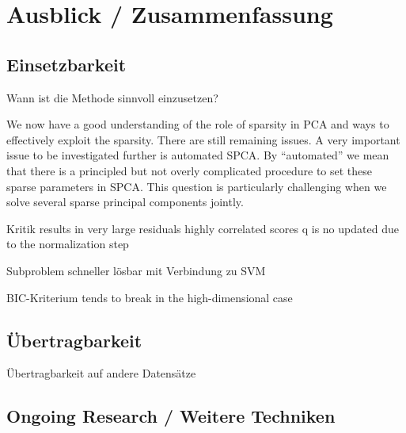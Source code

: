 \chapter{Ausblick / Zusammenfassung}

\label{conclusion}

\section{Einsetzbarkeit}
Wann ist die Methode sinnvoll einzusetzen?

We now have a good understanding of the role of
sparsity in PCA and ways to effectively exploit the sparsity.
There are still remaining issues. A very important issue to
be investigated further is automated SPCA. By “automated”
we mean that there is a principled but not overly complicated
procedure to set these sparse parameters in SPCA.
This question is particularly challenging when we solve
several sparse principal components jointly.

Kritik 
results in very large residuals
highly correlated scores
q is no updated due to the normalization step

Subproblem schneller lösbar mit Verbindung zu SVM

BIC-Kriterium tends to break in the high-dimensional case

\section{Übertragbarkeit}
Übertragbarkeit auf andere Datensätze

\section{Ongoing Research / Weitere Techniken}